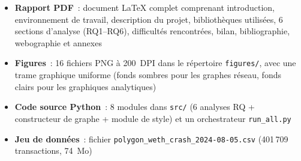 \begin{itemize}
  \item \textbf{Rapport PDF}~: document LaTeX complet comprenant introduction, environnement de travail, description du projet, biblioth\`eques utilis\'ees, 6 sections d'analyse (RQ1--RQ6), difficult\'es rencontr\'ees, bilan, bibliographie, webographie et annexes
  \item \textbf{Figures}~: 16 fichiers PNG \`a 200~DPI dans le r\'epertoire \texttt{figures/}, avec une trame graphique uniforme (fonds sombres pour les graphes r\'eseau, fonds clairs pour les graphiques analytiques)
  \item \textbf{Code source Python}~: 8 modules dans \texttt{src/} (6 analyses RQ + constructeur de graphe + module de style) et un orchestrateur \texttt{run\_all.py}
  \item \textbf{Jeu de donn\'ees}~: fichier \texttt{polygon\_weth\_crash\_2024-08-05.csv} (401\,709 transactions, 74~Mo)
\end{itemize}
